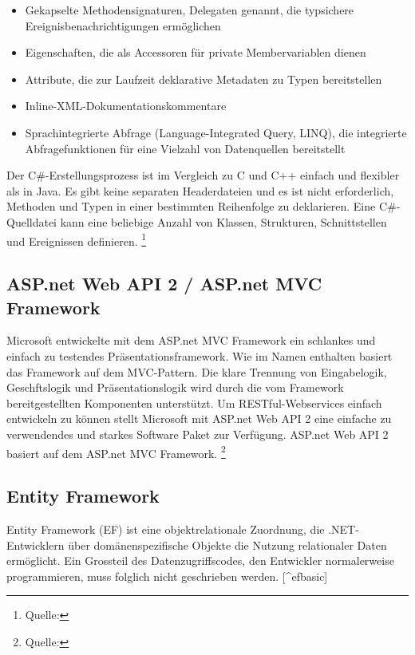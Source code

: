 \begin{itemize}
\tightlist
\item
  Gekapselte Methodensignaturen, Delegaten genannt, die typsichere
  Ereignisbenachrichtigungen ermöglichen
\item
  Eigenschaften, die als Accessoren für private Membervariablen dienen
\item
  Attribute, die zur Laufzeit deklarative Metadaten zu Typen
  bereitstellen
\item
  Inline-XML-Dokumentationskommentare
\item
  Sprachintegrierte Abfrage (Language-Integrated Query, LINQ), die
  integrierte Abfragefunktionen für eine Vielzahl von Datenquellen
  bereitstellt
\end{itemize}

Der C\#-Erstellungsprozess ist im Vergleich zu C und C++ einfach und
flexibler als in Java. Es gibt keine separaten Headerdateien und es ist
nicht erforderlich, Methoden und Typen in einer bestimmten Reihenfolge
zu deklarieren. Eine C\#-Quelldatei kann eine beliebige Anzahl von
Klassen, Strukturen, Schnittstellen und Ereignissen definieren.
\footnote{Quelle:\autocite{csharpbasic}}

\subsection{ASP.net Web API 2 / ASP.net MVC
Framework}\label{asp.net-web-api-2-asp.net-mvc-framework}

Microsoft entwickelte mit dem ASP.net MVC Framework ein schlankes und
einfach zu testendes Präsentationsframework. Wie im Namen enthalten
basiert das Framework auf dem MVC-Pattern. Die klare Trennung von
Eingabelogik, Geschftslogik und Präsentationslogik wird durch die vom
Framework bereitgestellten Komponenten unterstützt. Um
RESTful-Webservices einfach entwickeln zu können stellt Microsoft mit
ASP.net Web API 2 eine einfache zu verwendendes und starkes Software
Paket zur Verfügung. ASP.net Web API 2 basiert auf dem ASP.net MVC
Framework. \footnote{Quelle:\autocite{csharpbasic}}

\newpage

\subsection{Entity Framework}\label{entity-framework-1}

Entity Framework (EF) ist eine objektrelationale Zuordnung, die
.NET-Entwicklern über domänenspezifische Objekte die Nutzung
relationaler Daten ermöglicht. Ein Grossteil des Datenzugriffscodes, den
Entwickler normalerweise programmieren, muss folglich nicht geschrieben
werden. {[}\^{}efbasic{]}

